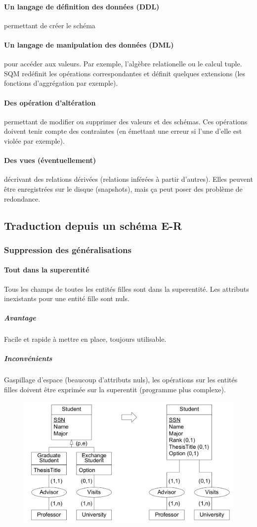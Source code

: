\documentclass[a4paper]{article}
\begin{document}
\paragraph{Un langage de définition des données (DDL)} permettant de créer le schéma
\paragraph{Un langage de manipulation des données (DML)} pour accéder aux valeurs.
Par exemple, l'algèbre relationelle ou le calcul tuple. SQM redéfinit les opérations
correspondantes et définit quelques extensions (les fonctions d'aggrégation par exemple).
\paragraph{Des opération d'altération} permettant de modifier ou supprimer des valeurs et des schémas.
Ces opérations doivent tenir compte des contraintes (en émettant une erreur si l'une d'elle est violée par exemple).
\paragraph{Des vues (éventuellement)} décrivant des relations dérivées
(relations inférées à partir d'autres). Elles peuvent être enregistrées sur le
disque (snapshots), mais ça peut poser des problème de redondance.

\subsection{Traduction depuis un schéma E-R}
\subsubsection{Suppression des généralisations}
\paragraph{Tout dans la superentité}
Tous les champs de toutes les entités filles sont dans la superentité. Les attributs
inexistants pour une entité fille sont nuls.
\subparagraph{Avantage}
Facile et rapide à mettre en place, toujours utilisable.
\subparagraph{Inconvénients}
Gaspillage d'espace (beaucoup d'attributs nuls), les opérations sur les entités
filles doivent être exprimée sur la superentit (programme plus complexe).
\begin{figure}[H]
    \center
    \includegraphics[width=.7\textwidth]{fig/er2rm-1.png}
\end{figure}
\end{document}
